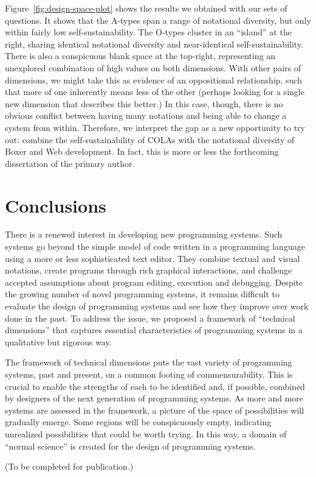 Figure~\ref{fig:design-space-plot} shows the results we obtained with
our sets of questions. It shows that the A-types span a range of
notational diversity, but only within fairly low self-sustainability.
The O-types cluster in an ``island'' at the right, sharing identical
notational diversity and near-identical self-sustainability. There is
also a conspicuous blank space at the top-right, representing an
unexplored combination of high values on both dimensions. With other
pairs of dimensions, we might take this as evidence of an oppositional
relationship, such that more of one inherently means less of the other
(perhaps looking for a single new dimension that describes this better.)
In this case, though, there is no obvious conflict between having many
notations and being able to change a system from within. Therefore, we
interpret the gap as a new opportunity to try out: combine the
self-sustainability of COLAs with the notational diversity of Boxer and
Web development. In fact, this is more or less the forthcoming
dissertation of the primary author.

\hypertarget{conclusions}{%
\section{Conclusions}\label{conclusions}}

There is a renewed interest in developing new programming systems. Such
systems go beyond the simple model of code written in a programming
language using a more or less sophisticated text editor. They combine
textual and visual notations, create programs through rich graphical
interactions, and challenge accepted assumptions about program editing,
execution and debugging. Despite the growing number of novel programming
systems, it remains difficult to evaluate the design of programming
systems and see how they improve over work done in the past. To address
the issue, we proposed a framework of ``technical dimensions'' that
captures essential characteristics of programming systems in a
qualitative but rigorous way.

The framework of technical dimensions puts the vast variety of
programming systems, past and present, on a common footing of
commensurability. This is crucial to enable the strengths of each to be
identified and, if possible, combined by designers of the next
generation of programming systems. As more and more systems are assessed
in the framework, a picture of the space of possibilities will gradually
emerge. Some regions will be conspicuously empty, indicating unrealized
possibilities that could be worth trying. In this way, a domain of
``normal science'' is created for the design of programming systems.

\acks

(To be completed for publication.)

